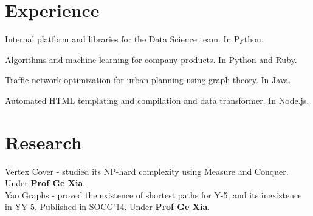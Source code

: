 \documentclass{deedy-resume-openfont}
\begin{document}
\hfill
\begin{minipage}[t]{0.66\textwidth} 


\section{Experience}
\vspace{\topsep} %
\begin{tightemize}
\item Internal platform and libraries for the Data Science team. In Python.
\item Algorithms and machine learning for company products. In Python and Ruby.
\end{tightemize}
\sectionsep

\begin{tightemize}
\item Traffic network optimization for urban planning using graph theory. In Java.
\end{tightemize}
\sectionsep

\begin{tightemize}
\item Automated HTML templating and compilation and data transformer. In Node.js.
\end{tightemize}
\sectionsep



\section{Research}
Vertex Cover - studied its NP-hard complexity using Measure and Conquer. Under \textbf{\href{http://www.cs.lafayette.edu/~gexia/}{Prof Ge Xia}}. \\
\sectionsep
{}
Yao Graphs - proved the existence of shortest paths for Y-5, and its inexistence in YY-5. Published in SOCG'14. Under \textbf{\href{http://www.cs.lafayette.edu/~gexia/}{Prof Ge Xia}}.
\sectionsep



\end{minipage}
\end{document}
